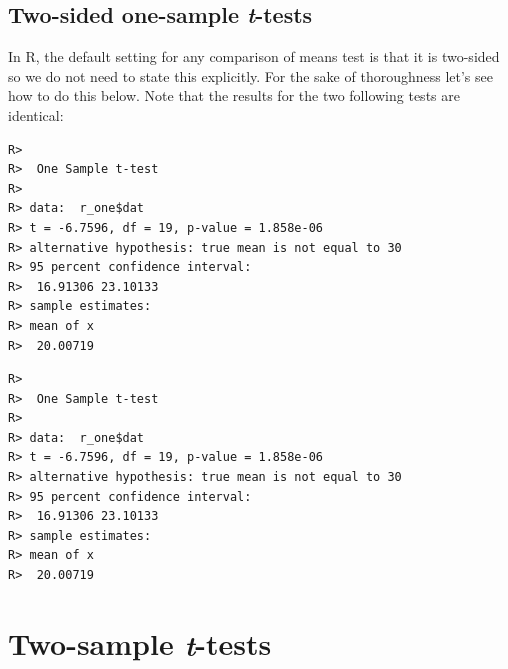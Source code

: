 \documentclass[english,10pt,a4paper,oneside]{book}
\newenvironment{Shaded}{\begin{snugshade}}{\end{snugshade}}
\newcommand{\CommentTok}[1]{\textcolor[rgb]{0.56,0.35,0.01}{\textit{#1}}}
\newcommand{\DataTypeTok}[1]{\textcolor[rgb]{0.13,0.29,0.53}{#1}}
\newcommand{\DecValTok}[1]{\textcolor[rgb]{0.00,0.00,0.81}{#1}}
\newcommand{\KeywordTok}[1]{\textcolor[rgb]{0.13,0.29,0.53}{\textbf{#1}}}
\newcommand{\NormalTok}[1]{#1}
\newcommand{\OperatorTok}[1]{\textcolor[rgb]{0.81,0.36,0.00}{\textbf{#1}}}
\newcommand{\StringTok}[1]{\textcolor[rgb]{0.31,0.60,0.02}{#1}}
\theoremstyle{definition}
\theoremstyle{definition}
\theoremstyle{definition}
\theoremstyle{remark}
\begin{document}
\hypertarget{two-sided-one-sample-t-tests}{%
\subsection{\texorpdfstring{Two-sided one-sample
\emph{t}-tests}{Two-sided one-sample t-tests}}\label{two-sided-one-sample-t-tests}}

In R, the default setting for any comparison of means test is that it is
two-sided so we do not need to state this explicitly. For the sake of
thoroughness let's see how to do this below. Note that the results for
the two following tests are identical:

\begin{Shaded}
\end{Shaded}

\begin{verbatim}
R> 
R>  One Sample t-test
R> 
R> data:  r_one$dat
R> t = -6.7596, df = 19, p-value = 1.858e-06
R> alternative hypothesis: true mean is not equal to 30
R> 95 percent confidence interval:
R>  16.91306 23.10133
R> sample estimates:
R> mean of x 
R>  20.00719
\end{verbatim}

\begin{Shaded}
\end{Shaded}

\begin{verbatim}
R> 
R>  One Sample t-test
R> 
R> data:  r_one$dat
R> t = -6.7596, df = 19, p-value = 1.858e-06
R> alternative hypothesis: true mean is not equal to 30
R> 95 percent confidence interval:
R>  16.91306 23.10133
R> sample estimates:
R> mean of x 
R>  20.00719
\end{verbatim}

\hypertarget{two-sample-t-tests}{%
\section{\texorpdfstring{Two-sample
\emph{t}-tests}{Two-sample t-tests}}\label{two-sample-t-tests}}
\end{document}
